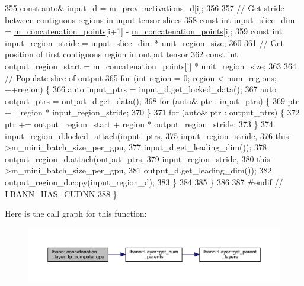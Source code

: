 \begin{DoxyCode}
355       \textcolor{keyword}{const} \textcolor{keyword}{auto}& input\_d = m\_prev\_activations\_d[i];
356 
357       \textcolor{comment}{// Get stride between contiguous regions in input tensor slices}
358       \textcolor{keyword}{const} \textcolor{keywordtype}{int} input\_slice\_dim = \hyperlink{classlbann_1_1concatenation__layer_a363324fe6cd104740334f3396085328c}{m\_concatenation\_points}[i+1] - 
      \hyperlink{classlbann_1_1concatenation__layer_a363324fe6cd104740334f3396085328c}{m\_concatenation\_points}[i];
359       \textcolor{keyword}{const} \textcolor{keywordtype}{int} input\_region\_stride = input\_slice\_dim * unit\_region\_size;
360 
361       \textcolor{comment}{// Get position of first contiguous region in output tensor}
362       \textcolor{keyword}{const} \textcolor{keywordtype}{int} output\_region\_start = m\_concatenation\_points[i] * unit\_region\_size;
363 
364       \textcolor{comment}{// Populate slice of output}
365       \textcolor{keywordflow}{for} (\textcolor{keywordtype}{int} region = 0; region < num\_regions; ++region) \{
366         \textcolor{keyword}{auto} input\_ptrs = input\_d.get\_locked\_data();
367         \textcolor{keyword}{auto} output\_ptrs = output\_d.get\_data();
368         \textcolor{keywordflow}{for} (\textcolor{keyword}{auto}& ptr : input\_ptrs) \{
369           ptr += region * input\_region\_stride;
370         \}
371         \textcolor{keywordflow}{for} (\textcolor{keyword}{auto}& ptr : output\_ptrs) \{
372           ptr += output\_region\_start + region * output\_region\_stride;
373         \}
374         input\_region\_d.locked\_attach(input\_ptrs,
375                                      input\_region\_stride,
376                                      this->m\_mini\_batch\_size\_per\_gpu,
377                                      input\_d.get\_leading\_dim());
378         output\_region\_d.attach(output\_ptrs,
379                                input\_region\_stride,
380                                this->m\_mini\_batch\_size\_per\_gpu,
381                                output\_d.get\_leading\_dim());
382         output\_region\_d.copy(input\_region\_d);
383       \}
384 
385     \}
386 
387 \textcolor{preprocessor}{  #endif // LBANN\_HAS\_CUDNN}
388   \}
\end{DoxyCode}
Here is the call graph for this function\+:\nopagebreak
\begin{figure}[H]
\begin{center}
\leavevmode
\includegraphics[width=350pt]{classlbann_1_1concatenation__layer_afd6cb5cf50acf95c2e3ba2e365be3525_cgraph}
\end{center}
\end{figure}

